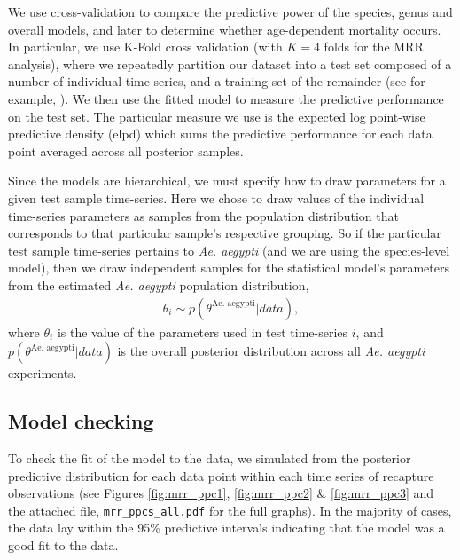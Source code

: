 \documentclass[12pt]{article}
\begin{document}
We use cross-validation to compare the predictive power of the species, genus and overall models, and later to determine whether age-dependent mortality occurs. In particular, we use K-Fold cross validation (with $K=4$ folds for the MRR analysis), where we repeatedly partition our dataset into a test set composed of a number of individual time-series, and a training set of the remainder (see for example, \cite{marsland2015machine}). We then use the fitted model to measure the predictive performance on the test set. The particular measure we use is the expected log point-wise predictive density (elpd)\citep{vehtari2015efficient} which sums the predictive performance for each data point averaged across all posterior samples. 

Since the models are hierarchical, we must specify how to draw parameters for a given test sample time-series. Here we chose to draw values of the individual time-series parameters as samples from the population distribution that corresponds to that particular sample's respective grouping. So if the particular test sample time-series pertains to \textit{Ae. aegypti} (and we are using the species-level model), then we draw independent samples for the statistical model's parameters from the estimated \textit{Ae. aegypti} population distribution,
%
\begin{align}
\theta_i \sim p(\theta^{\text{Ae. aegypti}}|data),
\end{align}
%
where $\theta_i$ is the value of the parameters used in test time-series $i$, and $p(\theta^{\text{Ae. aegypti}}|data)$ is the overall posterior distribution across all \textit{Ae. aegypti} experiments.

\subsection{Model checking}
To check the fit of the model to the data, we simulated from the posterior predictive distribution for each data point within each time series of recapture observations (see Figures \ref{fig:mrr_ppc1}, \ref{fig:mrr_ppc2} \&  \ref{fig:mrr_ppc3} and the attached file, \verb|mrr_ppcs_all.pdf| for the full graphs). In the majority of cases, the data lay within the 95\% predictive intervals indicating that the model was a good fit to the data. 
\end{document}

